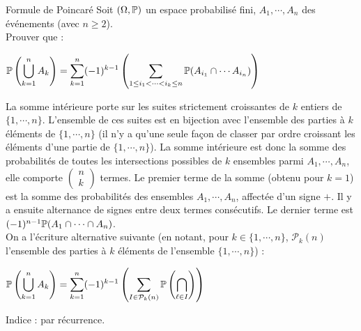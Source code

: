 \documentclass[12pt,a4paper]{report}
\begin{document}
\begin{exemple}[Exercice 5]{Formule de Poincaré}{}
Soit $(\Omega,\mathbb{P})$ un espace probabilisé fini, $A_1,\cdots,A_n$ des événements (avec $n \ge 2$). \\
Prouver que :
\begin{center}
$\displaystyle \mathbb{P}\left(\bigcup_{k=1}^n A_k\right) = \sum_{k=1}^n (-1)^{k-1} \left(\sum_{1 \le i_1 < \cdots < i_k \le n} \mathbb{P}(A_{i_1} \cap \cdots A_{i_n})\right)$
\end{center}

La somme intérieure porte sur les suites strictement croissantes de $k$ entiers de $\{1,\cdots,n\}$. L'ensemble de ces suites est en bijection avec l'ensemble des 
parties à $k$ éléments de $\{1,\cdots,n\}$ (il n'y a qu'une seule façon de classer par ordre croissant les éléments d'une partie de $\{1,\cdots,n\}$). La somme 
intérieure est donc la somme des probabilités de toutes les intersections possibles de $k$ ensembles parmi $A_1,\cdots,A_n$, elle comporte $\begin{pmatrix} n \\ k\end{pmatrix}$ termes. 
Le premier terme de la somme (obtenu pour $k = 1$) est la somme des probabilités des ensembles $A_1,\cdots,A_n$, affectée d'un signe $+$. Il y a ensuite alternance de 
signes entre deux termes consécutifs. Le dernier terme est $(-1)^{n-1}\mathbb{P}(A_1 \cap \cdots \cap A_n)$. \\

On a l'écriture alternative suivante (en notant, pour $k \in \{1,\cdots,n\}$, $\mathcal{P}_k(n)$ l'ensemble des parties à $k$ éléments de l'ensemble $\{1,\cdots,n\}$) :
\begin{center}
$\displaystyle \mathbb{P}\left(\bigcup_{k=1}^n A_k\right) = \sum_{k=1}^n (-1)^{k-1} \left(\sum_{I \in \mathcal{P}_k(n)} \mathbb{P}\left(\bigcap_{\ell \in I}\right)\right)$
\end{center}

Indice : par récurrence.

\end{exemple}
\end{document}
